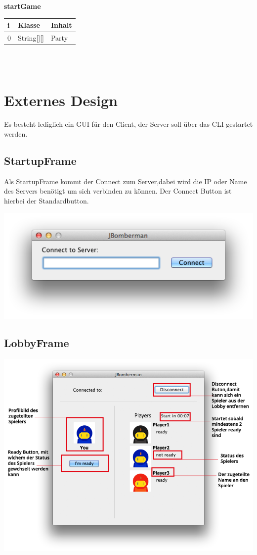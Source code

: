 \documentclass[11pt]{scrartcl}
\begin{document}
\textbf{startGame}\\

\begin{tabularx}{\linewidth}{l l l}
	\textbf{i} & \textbf{Klasse} & \textbf{Inhalt}\\
	\hline
	0 & String[][] & Party\\
\end{tabularx}\\\\

\newpage
\section{Externes Design}

Es besteht lediglich ein GUI für den Client, der Server soll über das CLI gestartet werden.
\subsection{StartupFrame}

Als StartupFrame kommt der Connect zum Server,dabei wird die IP oder Name
des Servers benötigt um sich verbinden zu können.
Der Connect Button ist hierbei der Standardbutton.

\includegraphics[scale=0.5]{StartupFrame}

\subsection{LobbyFrame}

\includegraphics[scale=0.55]{Lobby}
\end{document}
